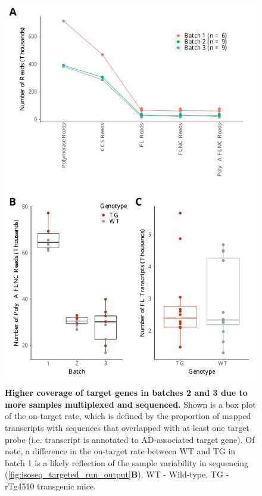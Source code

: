 \begin{figure}[!htp]
	\centering
		\includegraphics[page=2,trim={0 25cm 0 0},clip,scale = 0.55]{Figures/TargetedTranscriptome.pdf}
	\captionsetup{width=0.95\textwidth}
	\caption[On-target rate of Iso-Seq targeted profiling]%
	{\textbf{Higher coverage of target genes in batches 2 and 3 due to more samples multiplexed and sequenced.} Shown is a box plot of the on-target rate, which is defined by the proportion of mapped transcripts with sequences that overlapped with at least one target probe (i.e. transcript is annotated to AD-associated target gene). Of note, a difference in the on-target rate between WT and TG in batch 1 is a likely reflection of the sample variability in sequencing (\cref{fig:isoseq_targeted_run_output}\textbf{B}). WT - Wild-type, TG - rTg4510 transgenic mice.}
	\label{fig:isoseq_targeted_rate}
\end{figure}


